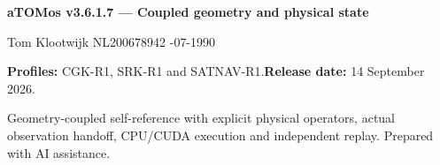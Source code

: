 \documentclass[11pt,a4paper]{article}
\begin{document}
\normalsize
\vfill
\begin{panel}
\textbf{aTOMos v3.6.1.7 --- Coupled geometry and physical state}\par
Tom Klootwijk \quad NL200678942 -07-1990\par
\textbf{Profiles:} CGK-R1, SRK-R1 and SATNAV-R1.\quad\textbf{Release date:} 14 September 2026.\par
Geometry-coupled self-reference with explicit physical operators, actual observation
handoff, CPU/CUDA execution and independent replay. Prepared with AI assistance.
\end{panel}
\end{document}
